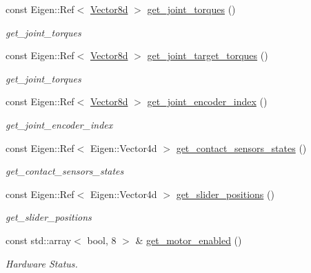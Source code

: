 \begin{DoxyCompactItemize}
const Eigen\+::\+Ref$<$ \hyperlink{common__header_8hpp_a98975ffbe0bca1296078e0350dfedd60}{Vector8d} $>$ \hyperlink{classblmc__robots_1_1Solo8TI_a79339925d2ad19cf8efff3af728a766f}{get\+\_\+joint\+\_\+torques} ()
\begin{DoxyCompactList}\small\item\em get\+\_\+joint\+\_\+torques \end{DoxyCompactList}\item 
const Eigen\+::\+Ref$<$ \hyperlink{common__header_8hpp_a98975ffbe0bca1296078e0350dfedd60}{Vector8d} $>$ \hyperlink{classblmc__robots_1_1Solo8TI_a3ed929d26586ef0aa35c4952e8c61f6d}{get\+\_\+joint\+\_\+target\+\_\+torques} ()
\begin{DoxyCompactList}\small\item\em get\+\_\+joint\+\_\+torques \end{DoxyCompactList}\item 
const Eigen\+::\+Ref$<$ \hyperlink{common__header_8hpp_a98975ffbe0bca1296078e0350dfedd60}{Vector8d} $>$ \hyperlink{classblmc__robots_1_1Solo8TI_a64832124d666033300a2d163db799f8a}{get\+\_\+joint\+\_\+encoder\+\_\+index} ()
\begin{DoxyCompactList}\small\item\em get\+\_\+joint\+\_\+encoder\+\_\+index \end{DoxyCompactList}\item 
const Eigen\+::\+Ref$<$ Eigen\+::\+Vector4d $>$ \hyperlink{classblmc__robots_1_1Solo8TI_aef169a78898e5ee8aaadc63942c3b7b6}{get\+\_\+contact\+\_\+sensors\+\_\+states} ()
\begin{DoxyCompactList}\small\item\em get\+\_\+contact\+\_\+sensors\+\_\+states \end{DoxyCompactList}\item 
const Eigen\+::\+Ref$<$ Eigen\+::\+Vector4d $>$ \hyperlink{classblmc__robots_1_1Solo8TI_ac02884b8402b774ce51c30be6fb4eda6}{get\+\_\+slider\+\_\+positions} ()
\begin{DoxyCompactList}\small\item\em get\+\_\+slider\+\_\+positions \end{DoxyCompactList}\item 
const std\+::array$<$ bool, 8 $>$ \& \hyperlink{classblmc__robots_1_1Solo8TI_acd7e33f11be0d4e63030d1ec4815eba5}{get\+\_\+motor\+\_\+enabled} ()
\begin{DoxyCompactList}\small\item\em Hardware Status. \end{DoxyCompactList}\item 

\end{DoxyCompactItemize}
